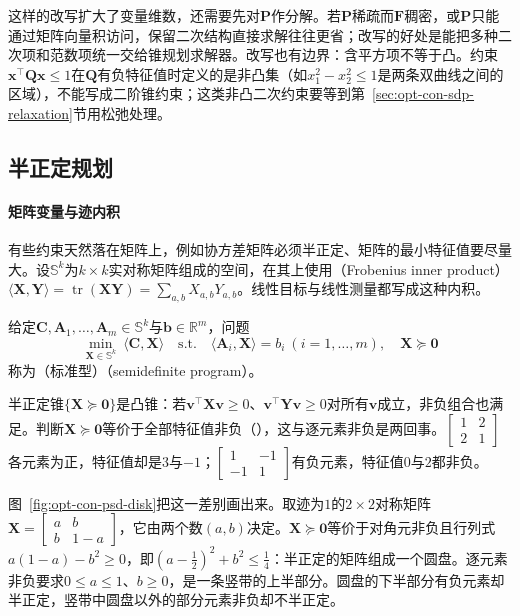 这样的改写扩大了变量维数，还需要先对$\bm P$作分解。若$\bm P$稀疏而$\bm F$稠密，或$\bm P$只能通过矩阵向量积访问，保留二次结构直接求解往往更省；改写的好处是能把多种二次项和范数项统一交给锥规划求解器。改写也有边界：含平方项不等于凸。约束$\bm x^\top\bm Q\bm x\leq1$在$\bm Q$有负特征值时定义的是非凸集（如$x_1^2-x_2^2\leq1$是两条双曲线之间的区域），不能写成二阶锥约束；这类非凸二次约束要等到第~\ref{sec:opt-con-sdp-relaxation}节用松弛处理。

\subsection{半正定规划}
\label{sec:opt-con-sdp}

\paragraph{矩阵变量与迹内积}
有些约束天然落在矩阵上，例如协方差矩阵必须半正定、矩阵的最小特征值要尽量大。设$\mathbb S^k$为$k\times k$实对称矩阵组成的空间，在其上使用（Frobenius inner product）$\langle\bm X,\bm Y\rangle=\operatorname{tr}(\bm X\bm Y)=\sum_{a,b}X_{a,b}Y_{a,b}$。线性目标与线性测量都写成这种内积。

\begin{definition}[半正定规划]
\label{def:opt-con-sdp}
给定$\bm C,\bm A_1,\dots,\bm A_m\in\mathbb S^k$与$\bm b\in\mathbb R^m$，问题
\[
  \min_{\bm X\in\mathbb S^k}\ \langle\bm C,\bm X\rangle\quad\text{s.t.}\quad\langle\bm A_i,\bm X\rangle=b_i\ (i=1,\dots,m),\quad\bm X\succeq\bm0
\]
称为（标准型）（semidefinite program）。
\end{definition}

半正定锥$\{\bm X\succeq\bm0\}$是凸锥：若$\bm v^\top\bm X\bm v\geq0$、$\bm v^\top\bm Y\bm v\geq0$对所有$\bm v$成立，非负组合也满足。判断$\bm X\succeq\bm0$等价于全部特征值非负（），这与逐元素非负是两回事。$\begin{bmatrix}1&2\\2&1\end{bmatrix}$各元素为正，特征值却是$3$与$-1$；$\begin{bmatrix}1&-1\\-1&1\end{bmatrix}$有负元素，特征值$0$与$2$都非负。

图~\ref{fig:opt-con-psd-disk}把这一差别画出来。取迹为$1$的$2\times2$对称矩阵$\bm X=\begin{bmatrix}a&b\\b&1-a\end{bmatrix}$，它由两个数$(a,b)$决定。$\bm X\succeq\bm0$等价于对角元非负且行列式$a(1-a)-b^2\geq0$，即$(a-\frac12)^2+b^2\leq\frac14$：半正定的矩阵组成一个圆盘。逐元素非负要求$0\leq a\leq1$、$b\geq0$，是一条竖带的上半部分。圆盘的下半部分有负元素却半正定，竖带中圆盘以外的部分元素非负却不半正定。


